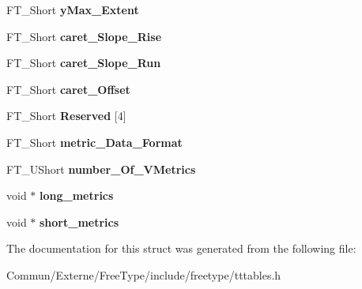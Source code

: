 \begin{DoxyCompactItemize}
\item 
F\+T\+\_\+\+Short {\bfseries y\+Max\+\_\+\+Extent}\hypertarget{struct_t_t___vert_header___af6927e95c1dfbe90c2e76b1eef521d53}{}\label{struct_t_t___vert_header___af6927e95c1dfbe90c2e76b1eef521d53}

\item 
F\+T\+\_\+\+Short {\bfseries caret\+\_\+\+Slope\+\_\+\+Rise}\hypertarget{struct_t_t___vert_header___a3218533a7d8ac5a8ebd70a970cbdbbcc}{}\label{struct_t_t___vert_header___a3218533a7d8ac5a8ebd70a970cbdbbcc}

\item 
F\+T\+\_\+\+Short {\bfseries caret\+\_\+\+Slope\+\_\+\+Run}\hypertarget{struct_t_t___vert_header___a98ff91b532d827440f7140d3071d473d}{}\label{struct_t_t___vert_header___a98ff91b532d827440f7140d3071d473d}

\item 
F\+T\+\_\+\+Short {\bfseries caret\+\_\+\+Offset}\hypertarget{struct_t_t___vert_header___a89ff9369f61dc5b770cde0eda954d402}{}\label{struct_t_t___vert_header___a89ff9369f61dc5b770cde0eda954d402}

\item 
F\+T\+\_\+\+Short {\bfseries Reserved} \mbox{[}4\mbox{]}\hypertarget{struct_t_t___vert_header___a54930b56bb8be0a8eb22753a9242fc5f}{}\label{struct_t_t___vert_header___a54930b56bb8be0a8eb22753a9242fc5f}

\item 
F\+T\+\_\+\+Short {\bfseries metric\+\_\+\+Data\+\_\+\+Format}\hypertarget{struct_t_t___vert_header___aa7c3983f62f7bf736eaaaae684b65dd7}{}\label{struct_t_t___vert_header___aa7c3983f62f7bf736eaaaae684b65dd7}

\item 
F\+T\+\_\+\+U\+Short {\bfseries number\+\_\+\+Of\+\_\+\+V\+Metrics}\hypertarget{struct_t_t___vert_header___a4ca6fe9cdd12fbc9a1129c4fbf6bddd1}{}\label{struct_t_t___vert_header___a4ca6fe9cdd12fbc9a1129c4fbf6bddd1}

\item 
void $\ast$ {\bfseries long\+\_\+metrics}\hypertarget{struct_t_t___vert_header___ac789245d0d6243bc965ad43702bdc671}{}\label{struct_t_t___vert_header___ac789245d0d6243bc965ad43702bdc671}

\item 
void $\ast$ {\bfseries short\+\_\+metrics}\hypertarget{struct_t_t___vert_header___ad5e875c19a02b0f6777db1c122bff2f3}{}\label{struct_t_t___vert_header___ad5e875c19a02b0f6777db1c122bff2f3}

\end{DoxyCompactItemize}


The documentation for this struct was generated from the following file\+:\begin{DoxyCompactItemize}
\item 
Commun/\+Externe/\+Free\+Type/include/freetype/tttables.\+h\end{DoxyCompactItemize}
